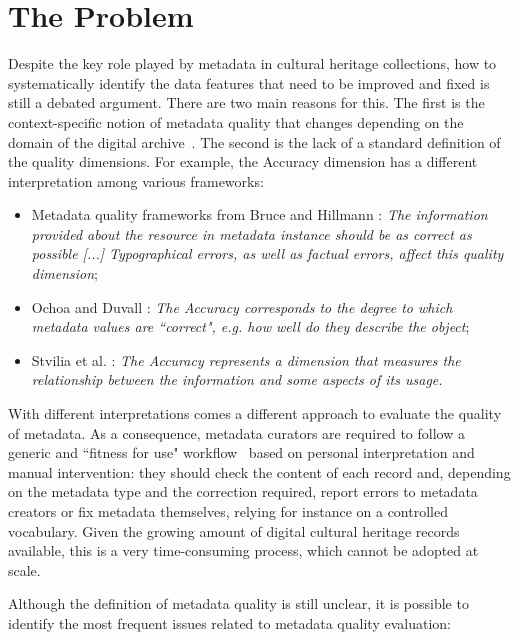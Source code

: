 \documentclass[epsfig,a4paper,12pt,titlepage]{book}
\begin{document}

\section{The Problem}
\label{sec:problem}
Despite the key role played by metadata in cultural heritage collections, how to systematically identify the data features that need to be improved and fixed is still a debated argument. There are two main reasons for this. The first is the context-specific notion of metadata quality that changes depending on the domain of the digital archive~\cite{6,19}. The second is the lack of a standard definition of the quality dimensions. For example, the Accuracy dimension has a different interpretation among various frameworks: 
\begin{itemize}
    \item Metadata quality frameworks from Bruce and Hillmann \cite{1}: \textit{The information provided about the resource in metadata instance should be as correct as possible [...] Typographical errors, as well as factual errors, affect this quality dimension};
    \item Ochoa and Duvall \cite{2}: \textit{The Accuracy corresponds to the degree to which metadata values are ``correct", e.g. how well do they  describe the object};
    \item Stvilia et al. \cite{20}: \textit{The Accuracy represents a dimension that measures the relationship between the information and some aspects of its usage.}

\end{itemize} 
With different interpretations comes a different approach to evaluate the quality of metadata. 
As a consequence, metadata curators are required to follow a generic and ``fitness for use" workflow~\cite{10.1016/j.websem.2008.02.005} based on personal interpretation and manual intervention: they  should check the content of each record and, depending on the metadata type and the correction required, report errors to metadata creators or fix metadata themselves, relying for instance on a controlled vocabulary.
Given the growing amount of digital cultural heritage records available, this is a very time-consuming process, which cannot be adopted at scale.  

Although the definition of metadata quality is still unclear, it is possible to identify the most frequent issues related to metadata quality evaluation:
\end{document}
